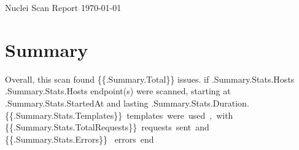 \documentclass{article}
\begin{document}

\begin{titlepage}
\begin{center}
{\huge Nuclei Scan Report}
\vfill
\large{\today}

\end{center}
\end{titlepage}


\section{Summary}

Overall, this scan found \num{ {{.Summary.Total}} } issues. {{if .Summary.Stats.Hosts}}
	{{.Summary.Stats.Hosts}} endpoint(s) were scanned, starting at {{.Summary.Stats.StartedAt}} and lasting {{.Summary.Stats.Duration}}. \SI{ {{.Summary.Stats.Templates}}} templates were used, with \SI{ {{.Summary.Stats.TotalRequests}}} requests sent and \SI{ {{.Summary.Stats.Errors}} } errors.
{{end}}
\end{document}
